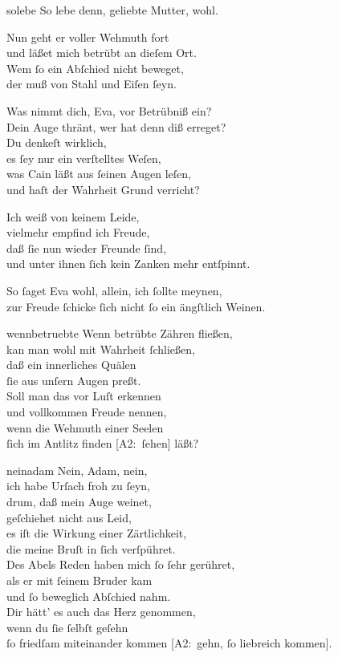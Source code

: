 \documentclass[abbrwidth=6em,tocstyle=ref-genre]{ees}
\newcommand\altlyrics[1]{[\textmd{A2}:~#1]}
\begin{document}
{\begin{movement}{solebe}
  \voice[Abel]
  So lebe denn, geliebte Mutter, wohl.

  \voice[Eva]
  Nun geht er voller Wehmuth fort\\
  und läßet mich betrübt an dieſem Ort.\\
  Wem ſo ein Abſchied nicht beweget,\\
  der muß von Stahl und Eiſen ſeyn.

  \voice[Adam]
  Was nimmt dich, Eva, vor Betrübniß ein?\\
  Dein Auge thränt, wer hat denn diß erreget?\\
  Du denkeſt wirklich,\\
  es ſey nur ein verſtelltes Weſen,\\
  was Cain läßt aus ſeinen Augen leſen,\\
  und haſt der Wahrheit Grund verricht?

  \voice[Eva]
  Ich weiß von keinem Leide,\\
  vielmehr empfind ich Freude,\\
  daß ſie nun wieder Freunde ſind,\\
  und unter ihnen ſich kein Zanken mehr entſpinnt.

  \voice[Adam]
  So ſaget Eva wohl, allein, ich ſollte meynen,\\
  zur Freude ſchicke ſich nicht ſo ein ängſtlich Weinen.
\end{movement}

\begin{movement}{wennbetruebte}
  \voice[Adam]
  Wenn betrübte Zähren fließen,\\
  kan man wohl mit Wahrheit ſchließen,\\
  daß ein innerliches Quälen\\
  ſie aus unſern Augen preßt.\\
  Soll man das vor Luſt erkennen\\
  und vollkommen Freude nennen,\\
  wenn die Wehmuth einer Seelen\\
  ſich im Antlitz finden \altlyrics{ſehen} läßt?
\end{movement}

\begin{movement}{neinadam}
  \voice[Eva]
  Nein, Adam, nein,\\
  ich habe Urſach froh zu ſeyn,\\
  drum, daß mein Auge weinet,\\
  geſchiehet nicht aus Leid,\\
  es iſt die Wirkung einer Zärtlichkeit,\\
  die meine Bruſt in ſich verſpühret.\\
  Des Abels Reden haben mich ſo ſehr gerühret,\\
  als er mit ſeinem Bruder kam\\
  und ſo beweglich Abſchied nahm.\\
  Dir hätt’ es auch das Herz genommen,\\
  wenn du ſie ſelbſt geſehn\\
  ſo friedſam miteinander kommen \altlyrics{gehn, ſo liebreich kommen}.


\end{movement}}
\end{document}
